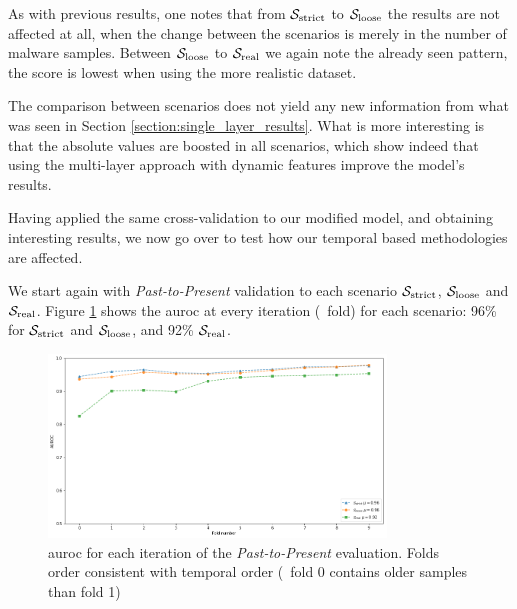 
As with previous results, one notes that from $\mathcal{S}_{\mathrm{strict}}$ to $\mathcal{S}_{\mathrm{loose}}$ the results are not affected at all, when the change between the scenarios is merely in the number of malware samples.
Between $\mathcal{S}_{\mathrm{loose}}$ to $\mathcal{S}_{\mathrm{real}}$ we again note the already seen pattern, the score is lowest when using the more realistic dataset.

The comparison between scenarios does not yield any new information from what was seen in Section \ref{section:single_layer_results}.
What is more interesting is that the absolute values are boosted in all scenarios, which show indeed that using the multi-layer approach with dynamic features improve the model's results.

Having applied the same cross-validation to our modified model, and obtaining interesting results, we now go over to test how our temporal based methodologies are affected.

\medskip

We start again with \textit{Past-to-Present} validation to each scenario $\mathcal{S}_{\mathrm{strict}}$, $\mathcal{S}_{\mathrm{loose}}$ and $\mathcal{S}_{\mathrm{real}}$.
Figure \ref{fig:pastpresent_modified} shows the \gls{auroc} at every iteration (\ie\ fold) for each scenario: 96\% for $\mathcal{S}_{\mathrm{strict}}$ and $\mathcal{S}_{\mathrm{loose}}$, and 92\% $\mathcal{S}_{\mathrm{real}}$.

\begin{figure}[!htb]
	\centering
	\includegraphics[width=0.8\textwidth]{Figures/pastpresent_improved.png}
	\caption[Multi layer results for dynamic features in \textit{Past-to-Present}.]{\gls{auroc} for each iteration of the \textit{Past-to-Present} evaluation. Folds order consistent with temporal order (\ie\ fold 0 contains older samples than
		fold 1)}
	\label{fig:pastpresent_modified}
\end{figure}

